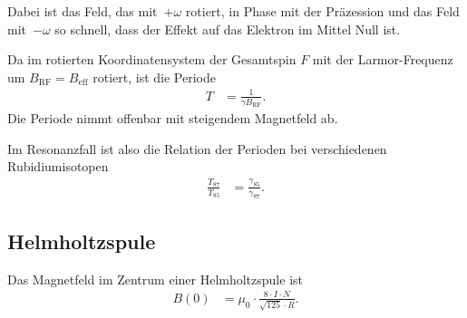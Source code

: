 Dabei ist das Feld, das mit~$+\omega$ rotiert, in Phase mit der
Präzession und das Feld mit~$-\omega$ so schnell, dass der Effekt auf das
Elektron im Mittel Null ist.

Da im rotierten Koordinatensystem der Gesamtspin $F$ mit der Larmor-Frequenz um
$B_\text{RF} = B_\text{eff}$ rotiert, ist die Periode
\begin{align}
  \label{eq:larmor_periode}
  T &= \frac{1}{\gamma B_\text{RF}}.
\end{align}
Die Periode nimmt offenbar mit steigendem Magnetfeld ab.

Im Resonanzfall ist also die Relation der Perioden bei verschiedenen Rubidiumisotopen
\begin{align}
  \label{eq:resonanz_perioden}
  \frac{T_{87}}{T_{85}} &= \frac{\gamma_{85}}{\gamma_{87}}.
\end{align}


\subsection{Helmholtzspule}%
\label{sub:helmholtzspule}
Das Magnetfeld im Zentrum einer Helmholtzspule ist
\begin{align}
	\label{eq:helm}
  B(0) &= \mu_{0} \cdot \frac{8 \cdot I \cdot N}{\sqrt{125} \cdot R}.
\end{align}
